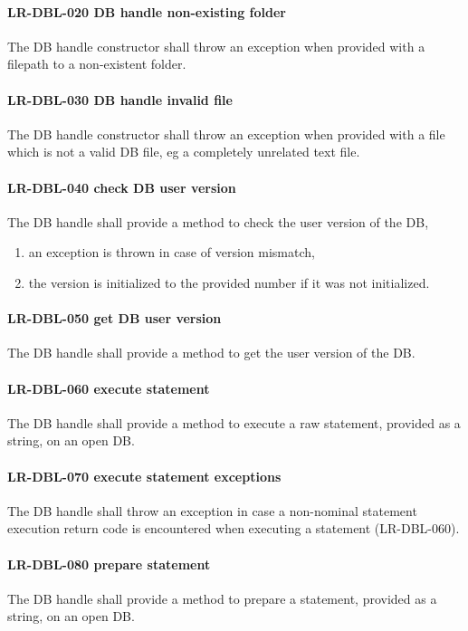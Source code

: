 \paragraph{LR-DBL-020 DB handle non-existing folder}
The DB handle constructor shall throw an exception when provided with a filepath
to a non-existent folder.

\paragraph{LR-DBL-030 DB handle invalid file}
The DB handle constructor shall throw an exception when provided with a
file which is not a valid DB file, eg a completely unrelated text file.

\paragraph{LR-DBL-040 check DB user version}
The DB handle shall provide a method to check the user version of the DB,
\begin{enumerate}
\item an exception is thrown in case of version mismatch,
\item the version is initialized to the provided number if it was not
      initialized.
\end{enumerate}

\paragraph{LR-DBL-050 get DB user version}
The DB handle shall provide a method to get the user version of the DB.

\paragraph{LR-DBL-060 execute statement}
The DB handle shall provide a method to execute a raw statement, provided
as a string, on an open DB.

\paragraph{LR-DBL-070 execute statement exceptions}
The DB handle shall throw an exception in case a non-nominal statement
execution return code is encountered when executing a statement (LR-DBL-060).

\paragraph{LR-DBL-080 prepare statement}
The DB handle shall provide a method to prepare a statement, provided
as a string, on an open DB.

